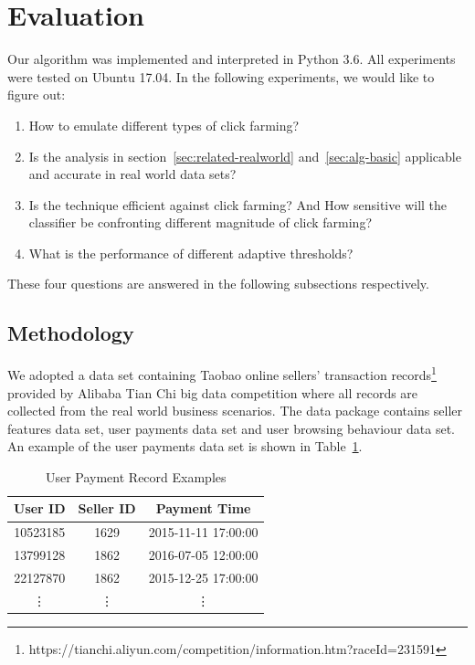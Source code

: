 \documentclass[10pt,conference,letterpaper]{IEEEtran}
\begin{document}
	\section{Evaluation}\label{sec:evaluation}
		Our algorithm was implemented and interpreted in Python 3.6. All experiments were tested on Ubuntu 17.04. In the following experiments, we would like to figure out:
	
		\begin{enumerate}
			\item How to emulate different types of click farming?
			\item Is the analysis in section~\ref{sec:related-realworld} and~\ref{sec:alg-basic} applicable and accurate in real world data sets?
			\item Is the technique efficient against click farming? And How sensitive will the classifier be confronting different magnitude of click farming?
			\item What is the performance of different adaptive thresholds?
		\end{enumerate}
	
		These four questions are answered in the following subsections respectively.
	
		\subsection{Methodology}\label{sec:exp-methodology}
			We adopted a data set containing Taobao online sellers' transaction records\footnote{https://tianchi.aliyun.com/competition/information.htm?raceId=231591} provided by Alibaba Tian Chi big data competition where all records are collected from the real world business scenarios. The data package contains seller features data set, user payments data set and user browsing behaviour data set. An example of the user payments data set is shown in Table~\ref{tab:user-payment-sample}.
	
			\begin{table}[!ht]
				\centering
				\caption{User Payment Record Examples}
				\label{tab:user-payment-sample}
				\begin{tabular}{|c|c|c|}
					\hline
					User ID & Seller ID & Payment Time\\
					\hline
					10523185 & 1629 & 2015-11-11 17:00:00\\
					\hline
					13799128 & 1862 & 2016-07-05 12:00:00\\
					\hline
					22127870 & 1862 & 2015-12-25 17:00:00\\
					\hline
					\vdots & \vdots & \vdots\\
					\hline
				\end{tabular}
			\end{table}
	
\end{document}
